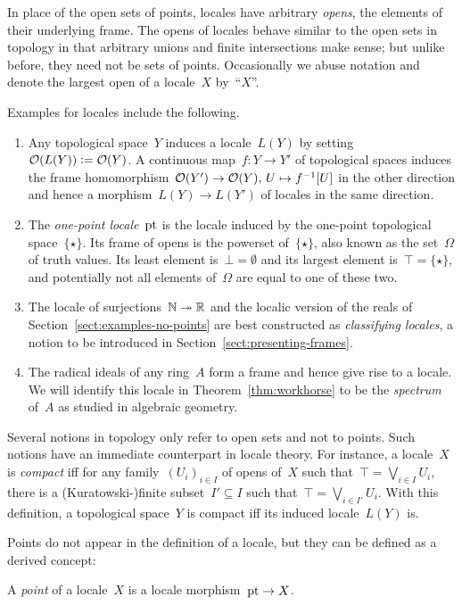 \documentclass{ws-rv9x6}
\begin{document}
{In place of the open sets of points, locales have arbitrary \emph{opens}, the
elements of their underlying frame. The opens of locales behave similar to the
open sets in topology in that arbitrary unions and finite intersections make
sense; but unlike before, they need not be sets of points. Occasionally we
abuse notation and denote the largest open of a locale~$X$ by~``$X$''.

Examples for locales include the following.
\begin{enumerate}
\item Any topological space~$Y$ induces a locale~$L(Y)$ by
setting~$\mathcal{O}(L(Y)) \vcentcolon= \mathcal{O}(Y)$. A continuous map~$f : Y \to Y'$ of topological
spaces induces the frame homomorphism~$\mathcal{O}(Y') \to \mathcal{O}(Y),\,U \mapsto f^{-1}[U]$
in the other direction and hence a morphism~$L(Y) \to L(Y')$ of locales in the
same direction.
\item The \emph{one-point locale}~$\mathrm{pt}$ is the locale induced
by the one-point topological space~$\{\star\}$. Its frame of opens is
the powerset of~$\{\star\}$, also known as the set~$\Omega$ of truth
values. Its least element is~$\bot = \emptyset$ and its largest element
is~$\top = \{\star\}$, and potentially not all elements of~$\Omega$ are equal
to one of these two.
\item The locale of surjections~$\mathbb{N} \twoheadrightarrow \mathbb{R}$ and the localic
version of the reals of Section~\ref{sect:examples-no-points} are best
constructed as \emph{classifying locales}, a notion to be introduced in
Section~\ref{sect:presenting-frames}.
\item The radical ideals of any ring~$A$ form a frame and hence give rise to a
locale. We will identify this locale in Theorem~\ref{thm:workhorse} to be the
\emph{spectrum} of~$A$ as studied in algebraic geometry.
\end{enumerate}

Several notions in topology only refer to open sets and not to points. Such
notions have an immediate counterpart in locale theory. For instance, a
locale~$X$ is \emph{compact} iff for any family~$(U_i)_{i \in I}$ of opens
of~$X$ such that~$\top = \bigvee_{i \in I} U_i$, there is a (Kuratowski-)finite
subset~$I' \subseteq I$ such that~$\top = \bigvee_{i \in I'} U_i$.
With this definition, a topological space~$Y$ is compact iff its induced locale~$L(Y)$ is.

Points do not appear in the definition of a locale, but they can be defined as
a derived concept:
\begin{definition}A \emph{point} of a locale~$X$ is a locale morphism~$\mathrm{pt} \to
X$.\end{definition}

}
\end{document}
